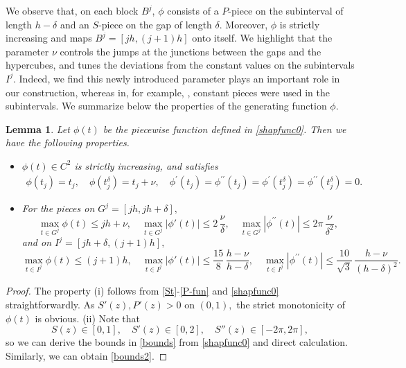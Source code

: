 \documentclass[10pt,reqno,final]{amsart}
\newtheorem{lmm}{\bf Lemma}[section]
\newenvironment{lemma}{\begin{lmm}}{\end{lmm}}
\theoremstyle{remark}
\theoremstyle{definition}
\newcommand{\wll}[1]{#1}
\begin{document}
\wll{We observe that, on each block $B^j$, \(\phi\) consists of a \(P\)-piece on the
subinterval of length \(h-\delta\) and an \(S\)-piece on the gap of length
\(\delta\). Moreover, \(\phi\) is strictly increasing and maps
\(B^j=[jh,(j+1)h]\) onto itself. We highlight that the parameter $\nu$ controls the jumps at the junctions between the gaps and the hypercubes, and tunes the deviations from the constant values on the subintervals $I^j$. Indeed, we find this newly introduced parameter plays an important role in our construction, 
whereas in, for example, \cite{Kahane1975,Lorentz1996,Igelnik2003}, constant pieces were used in the subintervals.
We summarize below the properties of the generating function $\phi$.} 
\begin{lemma}\label{Shape-Lemma0}  
Let $\phi(t)$ be the piecewise function defined in \eqref{shapfunc0}. Then we have the following properties.
\begin{itemize}
    \item[{\rm (i)}] $\phi(t)\in C^2$ is strictly  increasing,      and satisfies
\begin{equation}\label{intercond}
\begin{split}
\phi(t_j)=t_j,\quad \phi(t^{\delta}_j)=t_j+\nu,\quad  \phi^{\prime}(t_j)=\phi^{\prime\prime}(t_j)=\phi^{\prime}(t^{\delta}_j)=\phi^{\prime\prime}(t^{\delta}_j)=0.
\end{split}
\end{equation}

\item[{\rm (ii)}] 
For the pieces on  $ G^j=[jh, jh+\delta],$
\begin{equation}\label{bounds}
   \max_{t\in G^j}\phi(t)\le jh+\nu,\quad    
   \max_{t\in G^j} |\phi'(t)|\le 2\,\frac{\nu}{\delta},\quad   \max_{t\in G^j}|\phi^{\prime\prime}(t)|\leq 2\pi\,\frac {\nu}{\delta^{2}},
\end{equation}
and on $ I^j=[jh+\delta,(j+1)h],$
\begin{equation}\label{bounds2}
   \max_{t\in I^j} \phi(t)\le (j+1)h,\quad 
   \max_{t\in I^j}|\phi'(t)|\le \frac{15}{8}\,\frac{
   h-\nu}{h-\delta},\quad   \max_{t\in I^j}|\phi^{\prime\prime}(t)|\leq  \frac{10}{\sqrt{3}}\,\frac{h-\nu}{(h-\delta)^2}.
\end{equation}
\end{itemize}
\end{lemma}
\begin{proof} The property  (i) follows from \eqref{St}-\eqref{P-fun} and  \eqref{shapfunc0} straightforwardly.   As  $S'(z), P'(z)>0$ on $(0,1),$ the strict monotonicity of $\phi(t)$ is obvious. 
(ii) Note that   
$$ 
S(z)\in[0,1],\quad S'(z)\in [0, 2], \quad  S''(z)\in [-2\pi, 2\pi],  %
$$
so we can derive the bounds in \eqref{bounds}  from \eqref{shapfunc0} and direct calculation. 
Similarly, we can obtain \eqref{bounds2}.
\end{proof}
\end{document}
